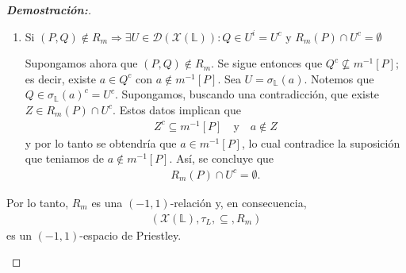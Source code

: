 \documentclass[12pt]{book}
\begin{document}
\begin{proof}[{\textbf{Demostración:}}]
\begin{itemize}
\begin{enumerate}
\vspace{0.2cm}
    
Consideremos ahora \(P \in \sigma_{\mathbb{L}}\bigl(m(a)\bigr)\), es decir, \(m(a)\in P\). Esto implica que $a\in m^{-1}[P]$. Teniendo en cuenta el Lema \ref{Ideales}, se sigue que \(m^{-1}[P]^c\) es un $i$-ideal, i.e., es un filtro. Puesto que $a\notin m^{-1}[P]^c$, el decreciente generado por \(a\), denotado \((a]\), no interseca a \(m^{-1}[P]^c\); en otras palabras,
\begin{align*}
    (a]\cap m^{-1}[P]^c=\emptyset.
\end{align*}
Por el teorema del filtro primo, existe un filtro primo \(Q\in \mathcal{X}(\mathbb{L})\) tal que
\begin{align*}
a\notin Q \quad \text{y} \quad m^{-1}[P]^c\subseteq Q
\end{align*}
Esto último implica que $Q^c\subseteq m^{-1}[P]$. Se sigue entonces que \((P,Q)\in R_m\) y, además, \(a\notin Q\); en otras palabras, \(Q\in \sigma_{\mathbb{L}}(a)^c\). Por lo tanto,
\begin{align*}
P\in R_m^{-1}\bigl(\sigma_{\mathbb{L}}(a)^c\bigr).
\end{align*}


\item Si $(P,Q)\notin R_m\Rightarrow \exists U\in \mathcal{D}(\mathcal{X}(\mathbb{L})): Q\in U^i = U^c\text{ y } R_m(P)\cap U^c=\emptyset$

\vspace{0.2cm}

Supongamos ahora que \((P,Q)\notin R_m\). Se sigue entonces que \(Q^c\nsubseteq m^{-1}[P]\); es decir, existe \(a\in Q^c\) con \(a\notin m^{-1}[P]\). Sea $U=\sigma_{\mathbb{L}}(a)$. Notemos que $Q\in \sigma_{\mathbb{L}}(a)^c=U^c$. Supongamos, buscando una contradicción, que existe \(Z\in R_m(P)\cap U^c\). Estos datos implican que
\begin{align*}
Z^c\subseteq m^{-1}[P] \quad \text{y} \quad a\notin Z 
\end{align*}
y por lo tanto se obtendría que $a\in m^{-1}[P]$, lo cual contradice la suposición que teniamos de $a\notin m^{-1}[P]$. Así, se concluye que
\begin{align*}
R_m(P)\cap U^c=\emptyset.
\end{align*}
\end{enumerate}

Por lo tanto, \(R_m\) es una \((-1,1)\)-relación y, en consecuencia,
\begin{align*}
(\mathcal{X}(\mathbb{L}),\tau_L,\subseteq, R_m)
\end{align*}
es un \((-1,1)\)-espacio de Priestley.
\end{itemize}
\end{proof}
\end{document}
